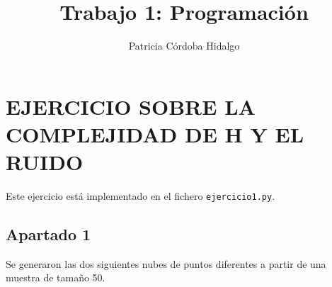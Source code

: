 \documentclass{article}
\begin{document}
\title{Trabajo 1: Programación}
\author{Patricia Córdoba Hidalgo}
\date{}
\maketitle

\tableofcontents

\section{EJERCICIO SOBRE LA COMPLEJIDAD DE H Y EL RUIDO}

Este ejercicio está implementado en el fichero \texttt{ejercicio1.py}.\\

\subsection{Apartado 1}

Se generaron las dos siguientes nubes de puntos diferentes a partir de una muestra de tamaño 50.

\begin{figure}[H]
  \centering
\end{figure}
\end{document}
